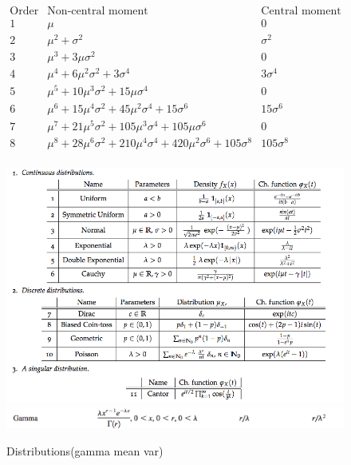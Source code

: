 \documentclass{article}
\begin{document}
\[
\begin{array}{l|l|l}
\text{Order}&\text{Non-central moment}&	\text{Central moment}\\
1    &\mu	&0\\
2    &\mu^2  + \sigma^2 &\sigma^  2\\
3    &\mu^3  + 3\mu \sigma^  2&0\\
4    &\mu^4  + 6\mu^2 \sigma^2  + 3\sigma^4 &3\sigma^  4\\
5    &\mu^5  + 10\mu^3 \sigma^2  + 15\mu \sigma^  4&0\\
6    &\mu^6  + 15\mu^4 \sigma^2  + 45\mu^2 \sigma^4  + 15\sigma^6 &15\sigma^  6\\
7    &\mu^7  + 21\mu^5 \sigma^2  + 105\mu^3 \sigma^4  + 105\mu \sigma^  6&0\\
8    &\mu^8  + 28\mu^6 \sigma^2  + 210\mu^4 \sigma^4  + 420\mu^2 \sigma^6  + 105\sigma^8 &105\sigma^  8\\
\end{array}
\]
\begin{figure}
  \centering
  \includegraphics[scale=0.65]{distributions.png}
  \includegraphics[scale=0.8]{gamma.png}
  \caption{Distributions(gamma mean var)}
\end{figure}
\end{document}
